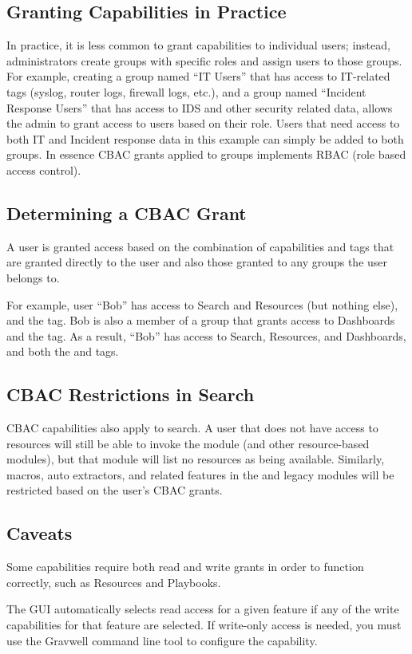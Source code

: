 \subsection{Granting Capabilities in Practice}

In practice, it is less common to grant capabilities to individual users; instead, administrators create groups with specific roles and assign users to those groups. For example, creating a group named ``IT Users'' that has access to IT-related tags (syslog, router logs, firewall logs, etc.), and a group named ``Incident Response Users'' that has access to IDS and other security related data, allows the admin to grant access to users based on their role. Users that need access to both IT and Incident response data in this example can simply be added to both groups.  In essence CBAC grants applied to groups implements RBAC (role based access control).

\subsection{Determining a CBAC Grant}

A user is granted access based on the combination of capabilities and tags that are granted directly to the user and also those granted to any groups the user belongs to.

For example, user ``Bob'' has access to Search and Resources (but nothing else), and the  tag. Bob is also a member of a group that grants access to Dashboards and the  tag. As a result, ``Bob'' has access to Search, Resources, and Dashboards, and both the  and  tags.

\subsection{CBAC Restrictions in Search}

CBAC capabilities also apply to search. A user that does not have access to resources will still be able to invoke the  module (and other resource-based modules), but that module will list no resources as being available. Similarly, macros, auto extractors, and related features in the  and legacy  modules will be restricted based on the user's CBAC grants.

\subsection{Caveats}

Some capabilities require both read and write grants in order to function correctly, such as Resources and Playbooks.

The GUI automatically selects read access for a given feature if any of the write capabilities for that feature are selected. If write-only access is needed, you must use the Gravwell command line tool to configure the capability.

